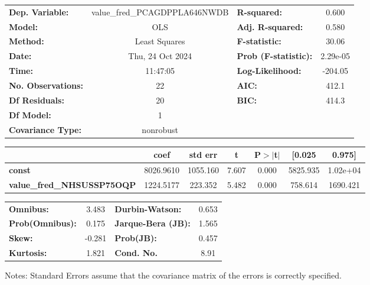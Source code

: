 \begin{center}
\begin{tabular}{lclc}
\toprule
\textbf{Dep. Variable:}            & value\_fred\_PCAGDPPLA646NWDB & \textbf{  R-squared:         } &     0.600   \\
\textbf{Model:}                    &              OLS              & \textbf{  Adj. R-squared:    } &     0.580   \\
\textbf{Method:}                   &         Least Squares         & \textbf{  F-statistic:       } &     30.06   \\
\textbf{Date:}                     &        Thu, 24 Oct 2024       & \textbf{  Prob (F-statistic):} &  2.29e-05   \\
\textbf{Time:}                     &            11:47:05           & \textbf{  Log-Likelihood:    } &   -204.05   \\
\textbf{No. Observations:}         &                 22            & \textbf{  AIC:               } &     412.1   \\
\textbf{Df Residuals:}             &                 20            & \textbf{  BIC:               } &     414.3   \\
\textbf{Df Model:}                 &                  1            & \textbf{                     } &             \\
\textbf{Covariance Type:}          &           nonrobust           & \textbf{                     } &             \\
\bottomrule
\end{tabular}
\begin{tabular}{lcccccc}
                                   & \textbf{coef} & \textbf{std err} & \textbf{t} & \textbf{P$> |$t$|$} & \textbf{[0.025} & \textbf{0.975]}  \\
\midrule
\textbf{const}                     &    8026.9610  &     1055.160     &     7.607  &         0.000        &     5825.935    &     1.02e+04     \\
\textbf{value\_fred\_NHSUSSP75OQP} &    1224.5177  &      223.352     &     5.482  &         0.000        &      758.614    &     1690.421     \\
\bottomrule
\end{tabular}
\begin{tabular}{lclc}
\textbf{Omnibus:}       &  3.483 & \textbf{  Durbin-Watson:     } &    0.653  \\
\textbf{Prob(Omnibus):} &  0.175 & \textbf{  Jarque-Bera (JB):  } &    1.565  \\
\textbf{Skew:}          & -0.281 & \textbf{  Prob(JB):          } &    0.457  \\
\textbf{Kurtosis:}      &  1.821 & \textbf{  Cond. No.          } &     8.91  \\
\bottomrule
\end{tabular}
\end{center}

Notes: \newline
 [1] Standard Errors assume that the covariance matrix of the errors is correctly specified.
